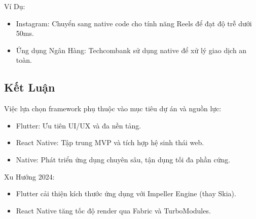     \begin{flushleft}
      \hspace*{0.8cm}Ví Dụ:
      \setlength{\leftmargini}{1.5cm}
      \begin{itemize}
          \item Instagram: Chuyển sang native code cho tính năng Reels để đạt độ trễ dưới 50ms.
          \item Ứng dụng Ngân Hàng: Techcombank sử dụng native để xử lý giao dịch an toàn.
      \end{itemize}
    \end{flushleft}

\subsection{Kết Luận}
\renewcommand{\labelitemi}{--}    
\begin{flushleft}
  \hspace*{0.8cm}Việc lựa chọn framework phụ thuộc vào mục tiêu dự án và nguồn lực:
  \setlength{\leftmargini}{1.5cm}
  \begin{itemize}
      \item Flutter: Ưu tiên UI/UX và đa nền tảng.
      \item React Native: Tập trung MVP và tích hợp hệ sinh thái web.
      \item Native: Phát triển ứng dụng chuyên sâu, tận dụng tối đa phần cứng.
  \end{itemize}
\end{flushleft}

\begin{flushleft}
  \hspace*{0.8cm}Xu Hướng 2024:
  \setlength{\leftmargini}{1.5cm}
  \begin{itemize}
      \item Flutter cải thiện kích thước ứng dụng với Impeller Engine (thay Skia).
      \item React Native tăng tốc độ render qua Fabric và TurboModules.
  \end{itemize}
\end{flushleft}